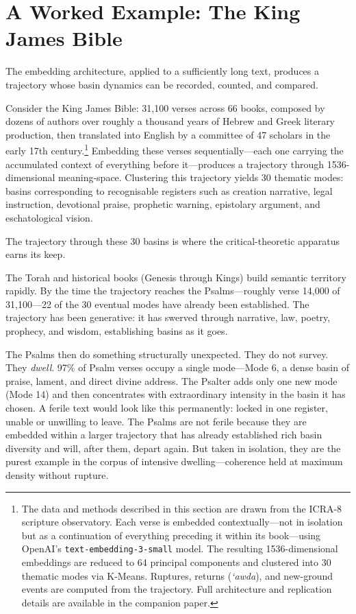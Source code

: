 \section{A Worked Example: The King James Bible}

The embedding architecture, applied to a sufficiently long text, produces a trajectory whose basin dynamics can be recorded, counted, and compared.

Consider the King James Bible: 31,100 verses across 66 books, composed by dozens of authors over roughly a thousand years of Hebrew and Greek literary production, then translated into English by a committee of 47 scholars in the early 17th century.\footnote{The data and methods described in this section are drawn from the ICRA-8 scripture observatory. Each verse is embedded contextually---not in isolation but as a continuation of everything preceding it within its book---using OpenAI's \texttt{text-embedding-3-small} model. The resulting 1536-dimensional embeddings are reduced to 64 principal components and clustered into 30 thematic modes via K-Means. Ruptures, returns (\emph{`awda}), and new-ground events are computed from the trajectory. Full architecture and replication details are available in the companion paper.} Embedding these verses sequentially---each one carrying the accumulated context of everything before it---produces a trajectory through 1536-dimensional meaning-space. Clustering this trajectory yields 30 thematic modes: basins corresponding to recognisable registers such as creation narrative, legal instruction, devotional praise, prophetic warning, epistolary argument, and eschatological vision.

The trajectory through these 30 basins is where the critical-theoretic apparatus earns its keep.

The Torah and historical books (Genesis through Kings) build semantic territory rapidly. By the time the trajectory reaches the Psalms---roughly verse 14,000 of 31,100---22 of the 30 eventual modes have already been established. The trajectory has been generative: it has swerved through narrative, law, poetry, prophecy, and wisdom, establishing basins as it goes.

The Psalms then do something structurally unexpected. They do not survey. They \emph{dwell}. 97\% of Psalm verses occupy a single mode---Mode 6, a dense basin of praise, lament, and direct divine address. The Psalter adds only one new mode (Mode 14) and then concentrates with extraordinary intensity in the basin it has chosen. A ferile text would look like this permanently: locked in one register, unable or unwilling to leave. The Psalms are not ferile because they are embedded within a larger trajectory that has already established rich basin diversity and will, after them, depart again. But taken in isolation, they are the purest example in the corpus of intensive dwelling---coherence held at maximum density without rupture.

